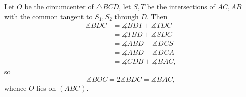 Let $O$ be the circumcenter of $\triangle{BCD}$, let $S,T$ be the intersections of $AC,AB$ with the common tangent to $S_1,S_2$ through $D$. Then
\begin{align*}
	\measuredangle{BDC}&=\measuredangle{BDT}+\measuredangle{TDC}\\
	&=\measuredangle{TBD}+\measuredangle{SDC}\\
	&=\measuredangle{ABD}+\measuredangle{DCS}\\
	&=\measuredangle{ABD}+\measuredangle{DCA}\\
	&=\measuredangle{CDB}+\measuredangle{BAC},
\end{align*}
so \[\measuredangle{BOC}=2\measuredangle{BDC}=\measuredangle{BAC},\] whence $O$ lies on $\left(ABC\right)$.
